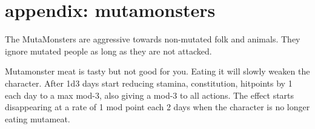 
































\clearpage
\raggedbottom
\section*{appendix: mutamonsters}
\label{appendixmutamonsters}

The MutaMonsters are aggressive towards non-mutated folk and animals. They ignore mutated people as long as they are not attacked.

Mutamonster meat is tasty but not good for you. Eating it will slowly weaken the character. After 1d3 days start reducing stamina, constitution, hitpoints by 1 each day to a max mod-3, also giving a mod-3 to all actions. The effect starts disappearing at a rate of 1 mod point each 2 days when the character is no longer eating mutameat.

